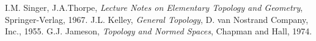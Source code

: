 \documentclass[12pt]{article}
\begin{document}
\begin{thebibliography}{9}
 I.M. Singer, J.A.Thorpe,
 \emph{Lecture Notes on Elementary Topology and Geometry},
 Springer-Verlag, 1967.
 J.L. Kelley, \emph{General Topology}, D. van Nostrand Company, Inc., 1955.
  G.J. Jameson, \emph{Topology and Normed Spaces},
 Chapman and Hall, 1974.
\end{thebibliography}
\end{document}
